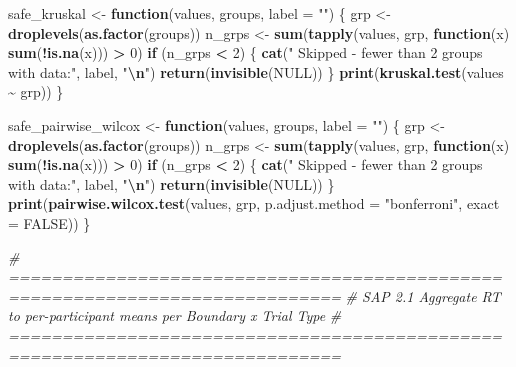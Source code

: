 \documentclass[
]{article}
\newenvironment{Shaded}{\begin{snugshade}}{\end{snugshade}}
\newcommand{\AttributeTok}[1]{\textcolor[rgb]{0.13,0.29,0.53}{#1}}
\newcommand{\CommentTok}[1]{\textcolor[rgb]{0.56,0.35,0.01}{\textit{#1}}}
\newcommand{\ConstantTok}[1]{\textcolor[rgb]{0.56,0.35,0.01}{#1}}
\newcommand{\ControlFlowTok}[1]{\textcolor[rgb]{0.13,0.29,0.53}{\textbf{#1}}}
\newcommand{\DecValTok}[1]{\textcolor[rgb]{0.00,0.00,0.81}{#1}}
\newcommand{\FunctionTok}[1]{\textcolor[rgb]{0.13,0.29,0.53}{\textbf{#1}}}
\newcommand{\NormalTok}[1]{#1}
\newcommand{\OtherTok}[1]{\textcolor[rgb]{0.56,0.35,0.01}{#1}}
\newcommand{\SpecialCharTok}[1]{\textcolor[rgb]{0.81,0.36,0.00}{\textbf{#1}}}
\newcommand{\StringTok}[1]{\textcolor[rgb]{0.31,0.60,0.02}{#1}}
\begin{document}
\begin{Shaded}
\begin{Highlighting}[]
\NormalTok{safe\_kruskal }\OtherTok{\textless{}{-}} \ControlFlowTok{function}\NormalTok{(values, groups, }\AttributeTok{label =} \StringTok{""}\NormalTok{) \{}
\NormalTok{  grp    }\OtherTok{\textless{}{-}} \FunctionTok{droplevels}\NormalTok{(}\FunctionTok{as.factor}\NormalTok{(groups))}
\NormalTok{  n\_grps }\OtherTok{\textless{}{-}} \FunctionTok{sum}\NormalTok{(}\FunctionTok{tapply}\NormalTok{(values, grp, }\ControlFlowTok{function}\NormalTok{(x) }\FunctionTok{sum}\NormalTok{(}\SpecialCharTok{!}\FunctionTok{is.na}\NormalTok{(x))) }\SpecialCharTok{\textgreater{}} \DecValTok{0}\NormalTok{)}
  \ControlFlowTok{if}\NormalTok{ (n\_grps }\SpecialCharTok{\textless{}} \DecValTok{2}\NormalTok{) \{}
    \FunctionTok{cat}\NormalTok{(}\StringTok{"  Skipped {-} fewer than 2 groups with data:"}\NormalTok{, label, }\StringTok{"}\SpecialCharTok{\textbackslash{}n}\StringTok{"}\NormalTok{)}
    \FunctionTok{return}\NormalTok{(}\FunctionTok{invisible}\NormalTok{(}\ConstantTok{NULL}\NormalTok{))}
\NormalTok{  \}}
  \FunctionTok{print}\NormalTok{(}\FunctionTok{kruskal.test}\NormalTok{(values }\SpecialCharTok{\textasciitilde{}}\NormalTok{ grp))}
\NormalTok{\}}

\NormalTok{safe\_pairwise\_wilcox }\OtherTok{\textless{}{-}} \ControlFlowTok{function}\NormalTok{(values, groups, }\AttributeTok{label =} \StringTok{""}\NormalTok{) \{}
\NormalTok{  grp    }\OtherTok{\textless{}{-}} \FunctionTok{droplevels}\NormalTok{(}\FunctionTok{as.factor}\NormalTok{(groups))}
\NormalTok{  n\_grps }\OtherTok{\textless{}{-}} \FunctionTok{sum}\NormalTok{(}\FunctionTok{tapply}\NormalTok{(values, grp, }\ControlFlowTok{function}\NormalTok{(x) }\FunctionTok{sum}\NormalTok{(}\SpecialCharTok{!}\FunctionTok{is.na}\NormalTok{(x))) }\SpecialCharTok{\textgreater{}} \DecValTok{0}\NormalTok{)}
  \ControlFlowTok{if}\NormalTok{ (n\_grps }\SpecialCharTok{\textless{}} \DecValTok{2}\NormalTok{) \{}
    \FunctionTok{cat}\NormalTok{(}\StringTok{"  Skipped {-} fewer than 2 groups with data:"}\NormalTok{, label, }\StringTok{"}\SpecialCharTok{\textbackslash{}n}\StringTok{"}\NormalTok{)}
    \FunctionTok{return}\NormalTok{(}\FunctionTok{invisible}\NormalTok{(}\ConstantTok{NULL}\NormalTok{))}
\NormalTok{  \}}
  \FunctionTok{print}\NormalTok{(}\FunctionTok{pairwise.wilcox.test}\NormalTok{(values, grp,}
                              \AttributeTok{p.adjust.method =} \StringTok{"bonferroni"}\NormalTok{, }\AttributeTok{exact =} \ConstantTok{FALSE}\NormalTok{))}
\NormalTok{\}}

\CommentTok{\# =============================================================================}
\CommentTok{\# SAP 2.1  Aggregate RT to per{-}participant means per Boundary x Trial Type}
\CommentTok{\# =============================================================================}


\end{Highlighting}
\end{Shaded}
\end{document}
